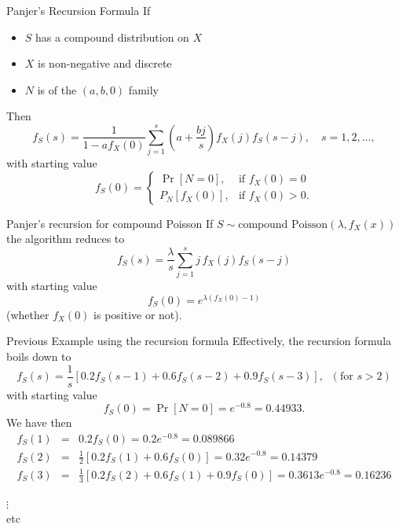 \documentclass[11pt]{beamer}
\begin{document}
\begin{frame}{Panjer's Recursion Formula}
If
\begin{itemize}
\item $S$ has a compound distribution on $X$
\item $X$ is non-negative and discrete 
\item $N$ is of the $(a,b,0)$ family
\end{itemize}

Then
$$f_{S}\left( s\right) =\frac{1}{1-af_X\left( 0\right) }\sum_{j=1}^{s}\left( a+\frac{bj}{s}\right) f_X\left( j\right) f_{S}\left( s-j\right),\quad s=1,2,\ldots,$$
with starting value
$$f_{S}\left( 0\right) =\left\{
\begin{array}{ll}
\Pr\left[ N=0\right] , & \text{if }f_X\left( 0\right) =0 \\
P_{N}\left[ f_X\left( 0\right) \right] , & \text{if }f_X\left( 0\right) >0.
\end{array}
\right. $$

\end{frame}
\begin{frame}{Panjer's recursion for compound Poisson}
If $S\sim\text{compound Poisson}(\lambda,f_X(x))$ the algorithm reduces to
$$f_{S}\left( s\right) =\frac{\lambda}{s}\sum_{j=1}^{s} j\,f_X\left(j\right) f_{S}\left( s-j\right) $$
with starting value
$$f_{S}\left( 0\right) =e^{\lambda(f_X(0)-1)}$$
(whether $f_X(0)$ is positive or not).

\end{frame}
\begin{frame}{Previous Example using the recursion formula}
Effectively, the recursion formula boils down to
$$f_{S}\left( s\right) =\frac{1}{s}\left[ 0.2f_{S}\left( s-1\right)+0.6f_{S}\left( s-2\right) +0.9f_{S}\left( s-3\right) \right], \;\; (\text{for }s>2)$$
with starting value
$$f_{S}\left( 0\right) =\Pr\left[ N=0\right]=e^{-0.8}=0.44933.$$
We have then
\begin{eqnarray*}
f_{S}\left( 1\right) &=& 0.2f_{S}\left( 0\right) =0.2e^{-0.8}=0.089866 \\
f_{S}\left( 2\right) &=&\frac{1}{2}\left[ 0.2f_{S}\left( 1\right)+0.6f_{S}\left( 0\right) \right] =0.32e^{-0.8}=0.14379 \\
f_{S}\left( 3\right) &=&\frac{1}{3}\left[ 0.2f_{S}\left( 2\right)+0.6f_{S}\left( 1\right) +0.9f_{S}\left( 0\right) \right]=0.3613e^{-0.8}=0.16236
\end{eqnarray*}
\begin{center}
$\vdots$ \\
etc
\end{center}

\end{frame}
\end{document}
